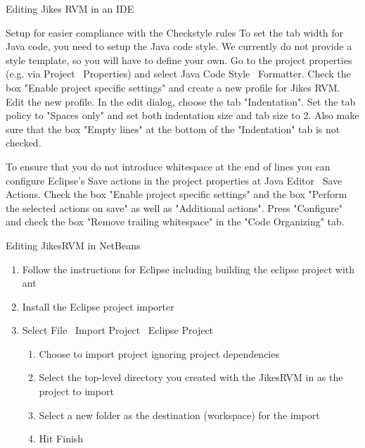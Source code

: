 \begin{section}{Editing Jikes RVM in an IDE}
\begin{subsection}{Setup for easier compliance with the Checkstyle rules}
To set the tab width for Java code, you need to setup the Java code style. We currently do not provide a style template, so you will have to define your own. Go to the project properties (e.g. via Project \textrightarrow\ Properties) and select Java Code Style \textrightarrow\ Formatter. Check the box "Enable project specific settings" and create a new profile for Jikes RVM. Edit the new profile. In the edit dialog, choose the tab "Indentation". Set the tab policy to "Spaces only" and set both indentation size and tab size to 2. Also make sure that the box "Empty lines" at the bottom of the "Indentation" tab is not checked.

To ensure that you do not introduce whitespace at the end of lines you can configure Eclipse's Save actions in the project properties at Java Editor \textrightarrow\ Save Actions. Check the box "Enable project specific settings" and the box "Perform the selected actions on save" as well as "Additional actions". Press "Configure" and check the box "Remove trailing whitespace" in the "Code Organizing" tab.

\end{subsection}

\begin{subsection}{Editing JikesRVM in NetBeans}

\begin{enumerate}
  \item Follow the instructions for Eclipse including building the eclipse project with ant
  \item Install the Eclipse project importer
  \item Select File \textrightarrow\ Import Project \textrightarrow\ Eclipse Project
    \begin{enumerate} 
      \item Choose to import project ignoring project dependencies
      \item Select the top-level directory you created with the JikesRVM in as the project to import
      \item Select a new folder as the destination (workspace) for the import
      \item Hit Finish
    \end{enumerate}
\end{enumerate}

\end{subsection}

\end{section}